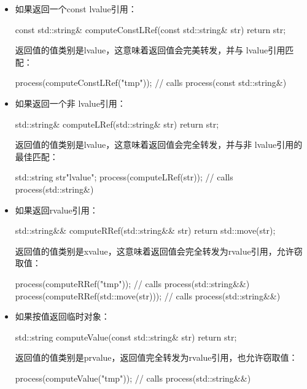 \begin{itemize}
	\item 如果返回一个const lvalue引用：

\begin{cppcode}
const std::string& computeConstLRef(const std::string& str) {
	return str;
}
\end{cppcode}
返回值的值类别是lvalue，这意味着返回值会完美转发，并与 lvalue引用匹配：

\begin{cppcode}
process(computeConstLRef("tmp")); // calls process(const std::string&)
\end{cppcode}
\item 如果返回一个非 lvalue引用：

\begin{cppcode}
std::string& computeLRef(std::string& str) {
	return str;
}
\end{cppcode}
返回值的值类别是lvalue，这意味着返回值会完全转发，并与非 lvalue引用的最佳匹配：

\begin{cppcode}
std::string str{"lvalue"};
process(computeLRef(str)); // calls process(std::string&)
\end{cppcode}
\item 如果返回rvalue引用：

\begin{cppcode}
std::string&& computeRRef(std::string&& str) {
	return std::move(str);
}
\end{cppcode}
返回值的值类别是xvalue，这意味着返回值会完全转发为rvalue引用，允许窃取值：

\begin{cppcode}
process(computeRRef("tmp")); // calls process(std::string&&)
process(computeRRef(std::move(str))); // calls process(std::string&&)
\end{cppcode}
\item 如果按值返回临时对象：

\begin{cppcode}
std::string computeValue(const std::string& str) {
	return str;
}
\end{cppcode}
返回值的值类别是prvalue，返回值完全转发为rvalue引用，也允许窃取值：

\begin{cppcode}
process(computeValue("tmp")); // calls process(std::string&&)
\end{cppcode}
\end{itemize}

